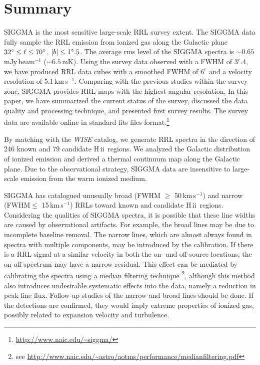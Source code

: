 \documentclass[manuscript]{aastex61}
\newcommand{\hii}{{\rm H\,}{{\sc ii}}}
\newcommand{\kms}{\,km\,s$^{-1}$}
\begin{document}
\section{Summary} \label{sec_summ}
SIGGMA is the most sensitive large-scale RRL survey extent.
The SIGGMA data fully sample the RRL emission from ionized gas along the Galactic plane $32\mbox{$^\circ$} \leq \ell \leq 70\mbox{$^\circ$}$, $|b|\le 1\mbox{$^\circ$}.5$.
The average rms level of the SIGGMA spectra is $\sim0.65$ mJy\,beam$^{-1}$ ($\sim6.5$\,mK).
Using the survey data observed with a FWHM of 3$\mbox{$^\prime$}$.4, we have produced RRL data cubes with a smoothed FWHM of 6$\mbox{$^\prime$}$ and a velocity resolution of 5.1\kms.
Comparing with the previous studies within the survey zone, SIGGMA provides RRL maps with the highest angular resolution.
In this paper, we have summarized the current status of the survey, discussed the data quality and processing technique, and presented first survey results.
The survey data are available online in standard fits files format.\footnote{\url{http://www.naic.edu/~siggma/}}

By matching with the {\it WISE} catalog, we generate RRL spectra in the direction of 246 known and 79 candidate \hii\ regions.
We analyzed the Galactic distribution of ionized emission and derived a thermal continuum map along the Galactic plane.
Due to the observational strategy, SIGGMA data are insensitive to large-scale emission from the warm ionized medium.

SIGGMA has catalogued unusually broad (FWHM $\geq$ 50\kms) and narrow (FWHM$\leq$ 15\kms) RRLs toward known and candidate \hii\ regions. Considering the qualities of SIGGMA spectra, it is possible that these line widths are caused by observational artifacts. For example, the broad lines may be due to incomplete baseline removal. The narrow lines, which are almost always found in spectra with multiple components, may be introduced by the calibration. If there is a RRL signal at a similar velocity in both the on- and off-source locations, the on-off spectrum may have a narrow residual. 
This effect can be mediated by calibrating the spectra using a median filtering technique \citep{McIntyre2013}\footnote{see \url{http://www.naic.edu/~astro/aotms/performance/medianfiltering.pdf}}, although this method also introduces undesirable systematic effects into the data, namely a reduction in peak line flux.
Follow-up studies of the narrow and broad lines should be done. If the detections are confirmed, they would imply extreme properties of ionized gas, possibly related to expansion velocity and turbulence.
\end{document}
